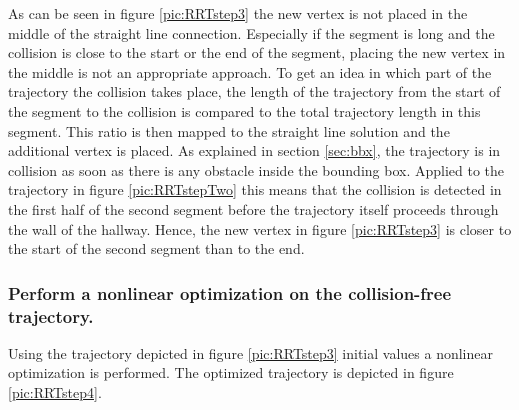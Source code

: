 As can be seen in figure \ref{pic:RRTstep3} the new vertex is not placed in the middle of the straight line connection. Especially if the segment is long and the collision is close to the start or the end of the segment, placing the new vertex in the middle is not an appropriate approach. To get an idea in which part of the trajectory the collision takes place, the length of the trajectory from the start of the segment to the collision is compared to the total trajectory length in this segment. This ratio is then mapped to the straight line solution and the additional vertex is placed. 
As explained in section \ref{sec:bbx}, the trajectory is in collision as soon as there is any obstacle inside the bounding box. Applied to the trajectory in figure \ref{pic:RRTstepTwo} this means that the collision is detected in the first half of the second segment before the trajectory itself proceeds through the wall of the hallway. Hence, the new vertex in figure \ref{pic:RRTstep3} is closer to the start of the second segment than to the end.






\subsubsection{Perform a nonlinear optimization on the collision-free trajectory.}

Using the trajectory depicted in figure \ref{pic:RRTstep3} initial values a nonlinear optimization is performed. The optimized trajectory is depicted in figure \ref{pic:RRTstep4}.

